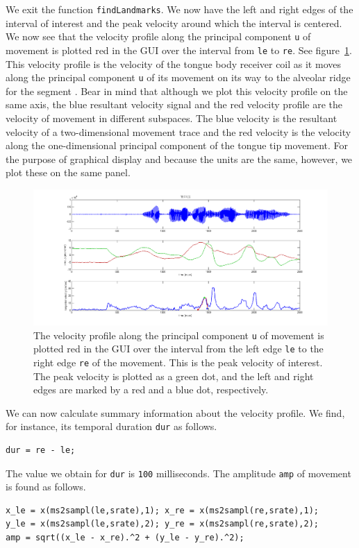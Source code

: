 \documentclass[a4paper, 12pt]{article}
\begin{document}
We exit the function \texttt{findLandmarks}. We now have the left and right edges of the interval of interest and the peak velocity around which the interval is centered. We now see that the velocity profile along the principal component \texttt{u} of movement is plotted red in the GUI over the interval from \texttt{le} to \texttt{re}. See figure~\ref{fig:velocityprofile}. This velocity profile is the velocity of the tongue body receiver coil as it moves along the principal component \texttt{u} of its movement on its way to the alveolar ridge for the segment . Bear in mind that although we plot this velocity profile on the same axis, the blue resultant velocity signal and the red velocity profile are the velocity of movement in different subspaces. The blue velocity is the resultant velocity of a two-dimensional movement trace and the red velocity is the velocity along the one-dimensional principal component of the tongue tip movement. For the purpose of graphical display and because the units are the same, however, we plot these on the same panel.
\begin{figure}
\centering
\includegraphics[width=.8\textwidth]{p3.png}
\caption{The velocity profile along the principal component \texttt{u} of movement is plotted red in the GUI over the interval from the left edge \texttt{le} to the right edge \texttt{re} of the movement. This is the peak velocity of interest. The peak velocity is plotted as a green dot, and the left and right edges are marked by a red and a blue dot, respectively.}
\label{fig:velocityprofile}
\end{figure}
We can now calculate summary information about the velocity profile. We find, for instance, its temporal duration \texttt{dur} as follows.
\begin{verbatim}
dur = re - le;
\end{verbatim}
The value we obtain for \texttt{dur} is \texttt{100} milliseconds. The amplitude \texttt{amp} of movement is found as follows.
\begin{verbatim}
x_le = x(ms2sampl(le,srate),1); x_re = x(ms2sampl(re,srate),1);
y_le = x(ms2sampl(le,srate),2); y_re = x(ms2sampl(re,srate),2);
amp = sqrt((x_le - x_re).^2 + (y_le - y_re).^2);
\end{verbatim}
\end{document}
